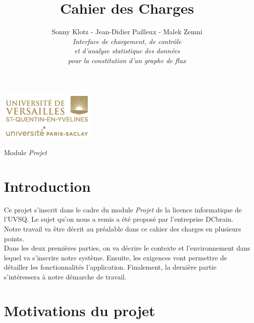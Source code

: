 

\title{\vspace{\fill}\textbf{\Huge Cahier des Charges}}
\author{
	Sonny Klotz - Jean-Didier Pailleux - Malek Zemni
	\vspace{2em}\\
	\textit{Interface de chargement, de contrôle}\\\textit{et d’analyse statistique des données}\\\textit{pour la constitution d’un graphe de flux}
	\vspace{2em}
}



\clearpage
\maketitle\vspace{13em}
\begin{center}\includegraphics[scale=0.7]{logo.png}\end{center}
\begin{flushright}Module \textit{Projet}\end{flushright}
\newpage
\tableofcontents
\newpage\clearpage{}

	\section*{Introduction}
		Ce projet s'inscrit dans le cadre du module \textit{Projet} de la licence informatique de l'UVSQ. Le sujet qu'on nous a remis a été proposé par l'entreprise DCbrain. Notre travail va être décrit au préalable dans ce cahier des charges en plusieurs points.\\
		Dans les deux premières parties, on va décrire le contexte et l'environnement dans lequel va s'inscrire notre système. Ensuite, les exigences vont permettre de détailler les fonctionnalités l'application. Finalement, la dernière partie s'intéressera à notre démarche de travail.
	
	\section{Motivations du projet}
